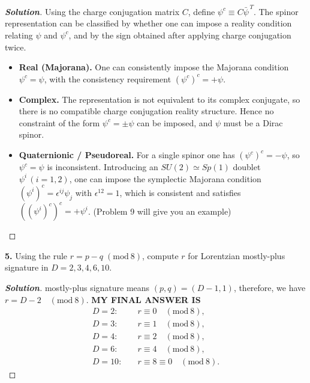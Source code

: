 \documentclass[11pt]{article}
\newenvironment{solution}[1][]{\begin{proof}[\textbf{Solution}]}{\end{proof}}
\begin{document}
\begin{solution}[13.4]
	Using the charge conjugation matrix \(C\), define \(\psi^c \equiv C\bar\psi^{\,T}\).
	The spinor representation can be classified by whether one can impose a reality condition relating \(\psi\) and \(\psi^c\),
	and by the sign obtained after applying charge conjugation twice.
	\begin{itemize}
		\item 	\textbf{Real (Majorana).}
		One can consistently impose the Majorana condition \(\psi^c=\psi\), with the consistency requirement
		\((\psi^c)^c=+\psi\).
		\item	\textbf{Complex.}
		The representation is not equivalent to its complex conjugate, so there is no compatible charge conjugation reality structure.
		Hence no constraint of the form \(\psi^c=\pm\psi\) can be imposed, and \(\psi\) must be a Dirac spinor.
		\item 	\textbf{Quaternionic / Pseudoreal.}
		For a single spinor one has \((\psi^c)^c=-\psi\), so \(\psi^c=\psi\) is inconsistent.
		Introducing an \(SU(2)\simeq Sp(1)\) doublet \(\psi^i\,(i=1,2)\), one can impose the symplectic Majorana condition
		\((\psi^i)^c=\epsilon^{ij}\psi_j\) with \(\epsilon^{12}=1\), which is consistent and satisfies \(((\psi^i)^c)^c=+\psi^i\). (Problem 9 will give you an example)
	\end{itemize}
\end{solution}

\begin{tcolorbox}[problem]
\textbf{5.} Using the rule $r=p-q\;(\mathrm{mod}\ 8)$, compute $r$ for Lorentzian mostly-plus signature in $D=2,3,4,6,10$.
\end{tcolorbox}
\begin{solution}[13.5]
	mostly-plus signature means $(p,q)=(D-1,1)$, therefore, we have $r= D-2\quad(\mathrm{mod~}8)$. \textbf{MY FINAL ANSWER IS}
	$$
	\boxed{
	\begin{aligned}D=2:&\quad r\equiv0\quad(\mathrm{mod~}8),\\D=3:&\quad r\equiv1\quad(\mathrm{mod~}8),\\D=4:&\quad r\equiv2\quad(\mathrm{mod~}8),\\D=6:&\quad r\equiv4\quad(\mathrm{mod~}8),\\D=10:&\quad r\equiv8\equiv0\quad(\mathrm{mod~}8).\end{aligned}
}
	$$
	
\end{solution}
\end{document}
